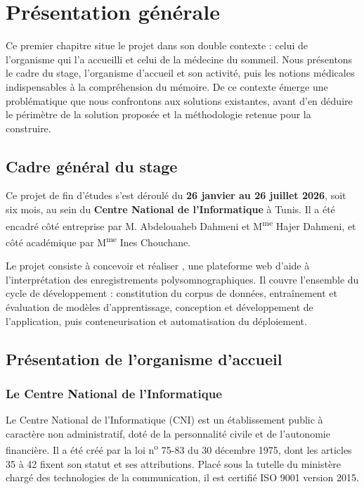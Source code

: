 \chapter{Présentation générale}
\label{chap:presentation}


Ce premier chapitre situe le projet dans son double contexte : celui de l'organisme
qui l'a accueilli et celui de la médecine du sommeil. Nous présentons le cadre du
stage, l'organisme d'accueil et son activité, puis les notions médicales
indispensables à la compréhension du mémoire. De ce contexte émerge une problématique
que nous confrontons aux solutions existantes, avant d'en déduire le périmètre de la
solution proposée et la méthodologie retenue pour la construire.

\section{Cadre général du stage}

Ce projet de fin d'études s'est déroulé du \textbf{26 janvier au 26 juillet 2026},
soit six mois, au sein du \textbf{Centre National de l'Informatique} à Tunis. Il a été
encadré côté entreprise par M. Abdelouaheb Dahmeni et M\textsuperscript{me} Hajer
Dahmeni, et côté académique par M\textsuperscript{me} Ines Chouchane.

Le projet consiste à concevoir et réaliser \hypnoria{}, une plateforme web d'aide à
l'interprétation des enregistrements polysomnographiques. Il couvre l'ensemble du
cycle de développement : constitution du corpus de données, entraînement et évaluation
de modèles d'apprentissage, conception et développement de l'application, puis
conteneurisation et automatisation du déploiement.

\section{Présentation de l'organisme d'accueil}

\subsection{Le Centre National de l'Informatique}

Le Centre National de l'Informatique (CNI) est un établissement public à caractère non
administratif, doté de la personnalité civile et de l'autonomie financière. Il a été
créé par la loi n\textsuperscript{o} 75-83 du 30 décembre 1975, dont les articles 35 à
42 fixent son statut et ses attributions. Placé sous la tutelle du ministère chargé des
technologies de la communication, il est certifié ISO 9001 version 2015.

